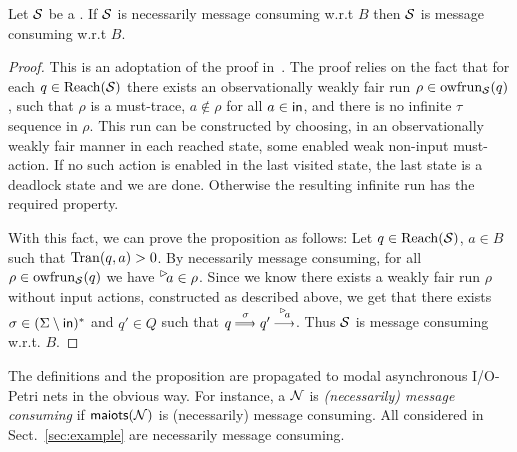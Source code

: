 \begin{proposition}\label{prop:properties}
    Let $\S$ be a \MAIOTS. If $\S$ is necessarily message consuming w.r.t $B$ then $\S$ is message consuming w.r.t $B$.
\end{proposition}
\begin{proof}
    This is an adoptation of the proof in~\cite{TechReportVersion}.
    The proof relies on the fact that for each $q \in \reach(\S)$ there exists an observationally weakly fair run $\rho \in \wfrun{\S}(q)$, such that $\rho$ is a must-trace, $a \not\in \rho$ for all $a \in \inset$, and there is no infinite $\tau$ sequence in $\rho$. This run can be constructed by choosing, in an observationally weakly fair manner in each reached state, some enabled weak non-input must-action. If no such action is enabled in the last visited state, the last state is a deadlock state and we are done. Otherwise the resulting infinite run has the required property.

    With this fact, we can prove the proposition as follows: Let $q \in \reach(\S)$, $a \in B$ such that $\val(q,a) > 0$. By necessarily message consuming, for all $\rho \in \wfrun{\S}(q)$ we have $\inact{a} \in \rho$. Since we know there exists a weakly fair run $\rho$ without input actions, constructed as described above, we get that there exists $\sigma \in (\Sigma \setminus \inset)^*$ and $q'\in Q$ such that $q \mustw{\sigma} q' \must{\inact{a}}$. Thus $\S$ is message consuming w.r.t. $B$.
\end{proof}




The definitions and the proposition are propagated to modal asynchronous I/O-Petri nets in the obvious way.
For instance, a \MAIOPN $\pnN$ is \emph{(necessarily) message consuming} if $\maiots(\pnN)$ is (necessarily) message consuming.
All \MAIOPNs considered in Sect.~\ref{sec:example} are necessarily message consuming.

